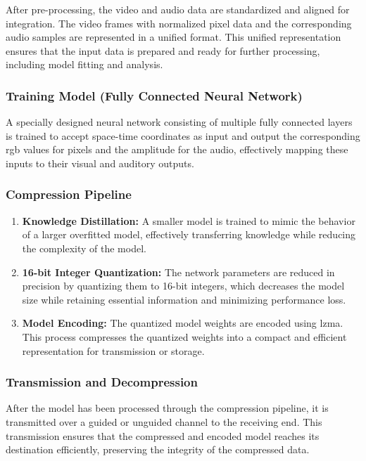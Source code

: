 \documentclass{ioereport}
\begin{document}
        After pre-processing, the video and audio data are standardized and aligned for integration. The video frames with normalized pixel data and the corresponding audio samples are represented in a unified format. This unified representation ensures that the input data is prepared and ready for further processing, including model fitting and analysis.
        
        \subsubsection{Training Model (Fully Connected Neural Network)}
        A specially designed neural network consisting of multiple fully connected layers is trained to accept space-time coordinates as input and output the corresponding \gls{rgb} values for pixels and the amplitude for the audio, effectively mapping these inputs to their visual and auditory outputs.
    
        \subsubsection{Compression Pipeline}
        \begin{enumerate}[label=\textbf{\roman*.}]
            \item \textbf{Knowledge Distillation:} A smaller model is trained to mimic the behavior of a larger overfitted model, effectively transferring knowledge while reducing the complexity of the model.
            \item \textbf{16-bit Integer Quantization:} The network parameters are reduced in precision by quantizing them to 16-bit integers, which decreases the model size while retaining essential information and minimizing performance loss.
            \item \textbf{Model Encoding:} The quantized model weights are encoded using \gls{lzma}. This process compresses the quantized weights into a compact and efficient representation for transmission or storage.
        \end{enumerate}
        \subsubsection{Transmission and Decompression}

        After the model has been processed through the compression pipeline, it is transmitted over a guided or unguided channel to the receiving end. This transmission ensures that the compressed and encoded model reaches its destination efficiently, preserving the integrity of the compressed data.
\end{document}
